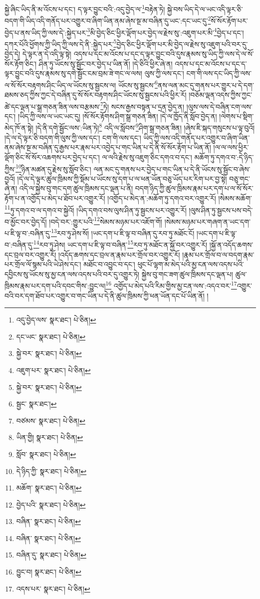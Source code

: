 སྐྱེ་ཞིང་ཡིད་ནི་མ་འོངས་པ་དང་། ད་ལྟར་བྱུང་བའི་:འདུ་བྱེད་ལ་\footnote{འདུ་བྱེད་ལས་  སྣར་ཐང་།  པེ་ཅིན། }བརྟེན་ཏེ། སྐྱེ་བས་ཡིད་དེ་ལ་ཡང་འདི་ལྟར་ཅི་བདག་གི་ཡིད་འདི་གནོད་པར་འགྱུར་བ་ཞིག་ཡིན་ནམ་ཞེས་སྔ་མ་བཞིན་དུ་ཡང་:དང་ཡང་དུ་\footnote{དང་ཡང་  སྣར་ཐང་།  པེ་ཅིན། }སོ་སོར་རྟོག་པར་བྱེད་པ་ནས་ཡིད་ཀྱི་ལས་དེ་:སྐྱེད་པར་\footnote{སྐྱེ་བར་  སྣར་ཐང་།  པེ་ཅིན། }མི་བྱེད་ཅིང་ཕྱིར་ལྡོག་པར་བྱེད་ལ་རྗེས་སུ་:འཇུག་པར་མི་\footnote{འཇུག་པར་  སྣར་ཐང་།  པེ་ཅིན། }བྱེད་པ་དང་། དཀར་པོའི་ཕྱོགས་ཀྱི་ཡིད་ཀྱི་ལས་དེ་ནི་:སྐྱེད་པར་\footnote{སྐྱེ་བར་  སྣར་ཐང་།  པེ་ཅིན། }བྱེད་ཅིང་ཕྱིར་ལྡོག་པར་མི་བྱེད་ལ་རྗེས་སུ་འཇུག་པའི་བར་དུ་བྱེད་དེ། དེ་ལྟར་ན་དེ་འདི་ལྟ་སྟེ། འདས་པ་དང་མ་འོངས་པ་དང་ད་ལྟར་བྱུང་བའི་དུས་རྣམས་སུ་ཡིད་ཀྱི་ལས་དེ་ལ་སོ་སོར་རྟོག་ཅིང་། ཤིན་ཏུ་ཡོངས་སུ་སྦྱོང་བར་བྱེད་པ་ཡིན་ནོ། །དེ་ཅིའི་ཕྱིར་ཞེ་ན། འདས་པ་དང་མ་འོངས་པ་དང་ད་ལྟར་བྱུང་བའི་དུས་རྣམས་སུ་དགེ་སྦྱོང་ངམ་བྲམ་ཟེ་གང་ལ་ལས། ལུས་ཀྱི་ལས་དང་། ངག་གི་ལས་དང་ཡིད་ཀྱི་ལས་ལ་སོ་སོར་བརྟགས་ཤིང་ཡིད་ལ་ཡོངས་སུ་སྦྱངས་ལ། ཡོངས་སུ་སྦྱངས་\footnote{སྦྱང་  སྣར་ཐང་། }ནས་ལན་མང་དུ་གནས་པར་གྱུར་པ་དེ་དག་ཐམས་ཅད་ཀྱིས་ཀྱང་དེ་བཞིན་དུ་སོ་སོར་བརྟགས་ཤིང་ཡོངས་སུ་སྦྱངས་པའི་ཕྱིར་རོ། །བཅོམ་ལྡན་འདས་ཀྱིས་ཀྱང་ཚེ་དང་ལྡན་པ་སྒྲ་གཅན་ཟིན་ལས་བརྩམས་\footnote{བཙམས་  སྣར་ཐང་།  པེ་ཅིན། }ཏེ། སངས་རྒྱས་བསྟན་པ་དྲན་བྱེད་ན། །ལུས་ལས་དེ་བཞིན་ངག་ལས་དང་། །ཡིད་ཀྱི་ལས་ལ་ཡང་ཡང་དུ། །སོ་སོར་རྟོགས་ཤིག་སྒྲ་གཅན་ཟིན། །དེ་ལ་ཁྱོད་ནི་སློབ་བྱེད་ན། །ལེགས་པ་སྡིག་མེད་ཁོ་ན་སྟེ། །དེ་ནི་དགེ་སྦྱོང་ལས་:ཡིན་ཏེ།\footnote{ཡིན་གྱི།  སྣར་ཐང་།  པེ་ཅིན། } འདི་ལ་སློབས་\footnote{སློབ་  སྣར་ཐང་།  པེ་ཅིན། }ཤིག་སྒྲ་གཅན་ཟིན། །ཞེས་ཇི་སྐད་གསུངས་པ་ལྟ་བུའོ། །དེ་ལ་དེ་ལྟར་ཅི་བདག་གི་ལུས་ཀྱི་ལས་དང་། ངག་གི་ལས་དང་། ཡིད་ཀྱི་ལས་འདི་གནོད་པར་འགྱུར་བ་ཞིག་ཡིན་ནམ་ཞེས་སྔ་མ་བཞིན་དུ་རྒྱས་པར་རྣམ་པར་འབྱེད་པ་གང་ཡིན་པ་དེ་ནི་སོ་སོར་རྟོག་པ་ཡིན་ནོ། །ལ་ལ་ལས་ཕྱིར་ལྡོག་ཅིང་སོ་སོར་འཆགས་པར་བྱེད་པ་དང་། ལ་ལའི་རྗེས་སུ་འཇུག་ཅིང་དགའ་བ་དང་། མཆོག་ཏུ་དགའ་བ་:དེ་ཉིད་ཀྱིས་\footnote{དེ་ཉིད་ཀྱི་  སྣར་ཐང་།  པེ་ཅིན། }ཉིན་མཚན་དུ་རྗེས་སུ་སློབ་ཅིང་། ལན་མང་དུ་གནས་པར་བྱེད་པ་གང་ཡིན་པ་དེ་ནི་ཡོངས་སུ་སྦྱོང་བ་ཞེས་བྱའོ། །དེ་ལ་དེ་ལྟར་ཚུལ་ཁྲིམས་ཀྱི་སྡོམ་པ་ཡོངས་སུ་དག་པ་ལ་ཕན་ཡོན་བཅུ་ཡོད་པར་རིག་པར་བྱ་སྟེ། བཅུ་གང་ཞེ་ན། འདི་ལ་སྐྱེས་བུ་གང་དག་ཚུལ་ཁྲིམས་དང་ལྡན་པ་ནི། བདག་ཉིད་ཀྱི་ཚུལ་ཁྲིམས་རྣམ་པར་དག་པ་ལ་སོ་སོར་རྟོག་པ་ན་འགྱོད་པ་མེད་པ་ཐོབ་པར་འགྱུར་རོ། །འགྱོད་པ་མེད་ན་:མཆོག་ཏུ་དགའ་བར་འགྱུར་རོ། །སེམས་མཆོག་\footnote{མཆོག་  སྣར་ཐང་།  པེ་ཅིན། }ཏུ་དགའ་བ་ལ་དགའ་བ་སྐྱེའོ། །ཡིད་དགའ་བས་ལུས་ཤིན་ཏུ་སྦྱངས་པར་འགྱུར་རོ། །ལུས་ཤིན་ཏུ་སྦྱངས་པས་བདེ་བ་མྱོང་བར་བྱེད་དོ། །བདེ་བར་:གྱུར་པའི་\footnote{བྱེད་པའི་  སྣར་ཐང་།  པེ་ཅིན། }སེམས་མཉམ་པར་འཇོག་གོ། །སེམས་མཉམ་པར་གཞག་ན་ཡང་དག་པ་ཇི་ལྟ་བ་:བཞིན་དུ་\footnote{བཞིན་  སྣར་ཐང་།  པེ་ཅིན། }རབ་ཏུ་ཤེས་སོ། །ཡང་དག་པ་ཇི་ལྟ་བ་བཞིན་དུ་རབ་ཏུ་མཐོང་ངོ། །ཡང་དག་པ་ཇི་ལྟ་བ་:བཞིན་དུ་\footnote{བཞིན་  སྣར་ཐང་།  པེ་ཅིན། }རབ་ཏུ་ཤེས། ཡང་དག་པ་ཇི་ལྟ་བ་བཞིན་\footnote{བཞིན་དུ་  སྣར་ཐང་།  པེ་ཅིན། }རབ་ཏུ་མཐོང་ན་སྐྱོ་བར་འགྱུར་རོ། །སྐྱོ་ན་འདོད་ཆགས་དང་བྲལ་བར་འགྱུར་རོ། །འདོད་ཆགས་དང་བྲལ་ན་རྣམ་པར་གྲོལ་བར་འགྱུར་རོ། །རྣམ་པར་གྲོལ་བ་ལ་བདག་རྣམ་པར་གྲོལ་ལོ་སྙམ་པའི་ཡེ་ཤེས་དང་། མཐོང་བ་འབྱུང་བ་དང་། ཕུང་པོ་ལྷག་མ་མེད་པའི་མྱ་ངན་ལས་འདས་པའི་དབྱིངས་སུ་ཡོངས་སུ་མྱ་ངན་ལས་འདས་པའི་བར་དུ་འགྱུར་ཏེ། སྐྱེས་བུ་གང་ཟག་ཚུལ་ཁྲིམས་དང་ལྡན་པ། ཚུལ་ཁྲིམས་རྣམ་པར་དག་པའི་དབང་གིས་:བྱུང་ལ།\footnote{བྱུང་བ།  སྣར་ཐང་།  པེ་ཅིན། } འགྱོད་པ་མེད་པའི་རིམ་གྱིས་མྱ་ངན་ལས་:འདའ་བར་\footnote{འདས་པར་  སྣར་ཐང་།  པེ་ཅིན། }འགྱུར་བའི་བར་དག་ཐོབ་པར་འགྱུར་བ་གང་ཡིན་པ་དེ་ནི་ཚུལ་ཁྲིམས་ཀྱི་ཕན་ཡོན་དང་པོ་ཡིན་ནོ། །
